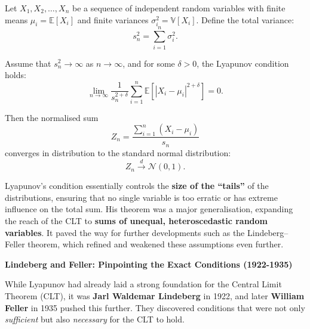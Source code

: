 \begin{theorem}
Let \( X_1, X_2, \ldots, X_n \) be a sequence of independent random variables with finite means \( \mu_i = \mathbb{E}[X_i] \) and finite variances \( \sigma_i^2 = \mathbb{V}[X_i] \). Define the total variance:
\[
s_n^2 = \sum_{i=1}^n \sigma_i^2.
\]

Assume that \( s_n^2 \to \infty \) as \( n \to \infty \), and for some \( \delta > 0 \), the Lyapunov condition holds:
\[
\lim_{n \to \infty} \frac{1}{s_n^{2+\delta}} \sum_{i=1}^{n} \mathbb{E}\left[ |X_i - \mu_i|^{2+\delta} \right] = 0.
\]

Then the normalised sum
\[
Z_n = \frac{\sum_{i=1}^{n} (X_i - \mu_i)}{s_n}
\]
converges in distribution to the standard normal distribution:
\[
Z_n \xrightarrow{d} \mathcal{N}(0,1).
\]
\end{theorem}

Lyapunov’s condition essentially controls the \textbf{size of the “tails”} of the distributions, ensuring that no single variable is too erratic or has extreme influence on the total sum. His theorem was a major generalisation, expanding the reach of the CLT to \textbf{sums of unequal, heteroscedastic random variables}. It paved the way for further developments such as the Lindeberg--Feller theorem, which refined and weakened these assumptions even further. 


\vspace{1em}
\noindent \textbf{Lindeberg and Feller: Pinpointing the Exact Conditions (1922-1935)}
\vspace{0.5em}

While Lyapunov had already laid a strong foundation for the Central Limit Theorem (CLT), it was \textbf{Jarl Waldemar Lindeberg} in 1922, and later \textbf{William Feller} in 1935 pushed this further. They discovered conditions that were not only \emph{sufficient} but also \emph{necessary} for the CLT to hold.


